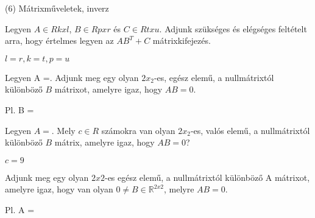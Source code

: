 \begin{frame}[plain]
\begin{tcolorbox}[center, colback={myyellow}, coltext={black}, colframe={myyellow}]
    {\RHuge  (6) Mátrixműveletek, inverz }
    \mmedskip
\end{tcolorbox}
\end{frame}

\begin{frame}
  \begin{tcolorbox}[title={6/1. {\symknight}}]
    Legyen $A \in Rkxl$, $B \in Rpxr$ és $C \in Rtxu$. Adjunk szükséges és elégséges feltételt arra, hogy értelmes legyen az $AB^T + C$ mátrixkifejezés.
  \tcblower

    \mmedskip 
    
    $l = r, k = t, p = u$
  \end{tcolorbox}
\end{frame}


\begin{frame}
  \begin{tcolorbox}[title={6/2. {\symknight}}]
    Legyen A =. Adjunk meg egy olyan $2x_2$-es, egész elemű, a nullmátrixtól különböző $B$ mátrixot, amelyre igaz, hogy $AB = 0$.

  \tcblower

    \mmedskip 
    
    Pl. B =
  \end{tcolorbox}
\end{frame}


\begin{frame}
  \begin{tcolorbox}[title={6/3. {\symknight}}]
     Legyen $A = .$ Mely $c \in R$ számokra van olyan $2x_2$-es, valós elemű, a nullmátrixtól különböző $B$ mátrix, amelyre igaz, hogy $AB = 0$?
  \tcblower

    \mmedskip 
    
    $c = 9$
  \end{tcolorbox}
\end{frame}


\begin{frame}
  \begin{tcolorbox}[title={6/4. {\symknight}}]
     Adjunk meg egy olyan $2x2$-es egész elemű, a nullmátrixtól különböző A mátrixot, amelyre igaz, hogy van olyan $0 \neq B \in \mathbb{R}^{2 x 2}$, melyre $AB = 0$.
  \tcblower

    \mmedskip 
    
    Pl. A =
  \end{tcolorbox}
\end{frame}


